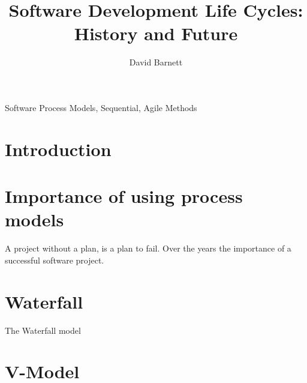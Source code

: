 \documentclass{style/CRPITStyle}
\renewcommand{\cite}{\citep}
\begin{document}
\title{Software Development Life Cycles: History and Future}
\author{David Barnett}

\maketitle

\begin{abstract}
\end{abstract}
\vspace{.1in}

 Software Process Models, Sequential, Agile Methods

\vspace{.1in}

\section{Introduction}

\section{Importance of using process models}
A project without a plan, is a plan to fail. Over the years the importance of a
successful software project.

\section{Waterfall} %

The Waterfall model \cite{Waterfall:1970}

\section{V-Model} %
\end{document}
